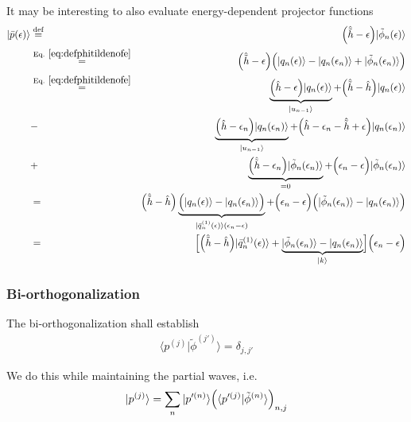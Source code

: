 \documentclass[11pt,a4paper]{report}
\begin{document}
It may be interesting to also evaluate energy-dependent projector
functions
\begin{eqnarray}
|\bar{p}(\epsilon)\rangle&\defas&
\Bigl(\hat{\tilde{h}}-\epsilon\Bigr)|\tilde{\phi}_n(\epsilon)\rangle
\nonumber\\
&\eqrel{eq:defphitildenofe}{=}&
\Bigl(\hat{\tilde{h}}-\epsilon\Bigr)
\Bigl(|q_n(\epsilon)\rangle-|q_n(\epsilon_n)\rangle+
|\tilde{\phi}_n(\epsilon_n)\rangle\Bigr)
\nonumber\\
&\eqrel{eq:defphitildenofe}{=}&
\underbrace{\Bigl(\hat{h}-\epsilon\Bigr)|q_n(\epsilon)\rangle}_{|u_{n-1}\rangle}
+\Bigl(\hat{\tilde{h}}-\hat{h}\Bigr)|q_n(\epsilon)\rangle
\nonumber\\
&-&\underbrace{
\Bigl(\hat{h}-\epsilon_n\Bigr)|q_n(\epsilon_n)\rangle}_{|u_{n-1}\rangle}
+\Bigl(\hat{h}-\epsilon_n-\hat{\tilde{h}}+\epsilon\Bigr)|q_n(\epsilon_n)\rangle
\nonumber\\
&+&\underbrace{\Bigl(\hat{\tilde{h}}-\epsilon_n\Bigr)|\tilde{\phi}_n(\epsilon_n)\rangle}_{=0}
+\Bigl(\epsilon_n-\epsilon\Bigr)|\tilde{\phi}_n(\epsilon_n)\rangle
\nonumber\\
&=&\Bigl(\hat{\tilde{h}}-\hat{h}\Bigr)
\underbrace{
\Bigl(|q_n(\epsilon)\rangle-|q_n(\epsilon_n)\rangle\Bigr)
}_{|\bar{q}_n^{(1)}(\epsilon)\rangle(\epsilon_n-\epsilon)}
+\Bigl(\epsilon_n-\epsilon\Bigr)
\Bigl(|\tilde{\phi}_n(\epsilon_n)\rangle
-|q_n(\epsilon_n)\rangle\Bigr)
\nonumber\\
&=&\Bigl[
\Bigl(\hat{\tilde{h}}-\hat{h}\Bigr)
|\bar{q}_n^{(1)}(\epsilon)\rangle
+
\underbrace{|\tilde{\phi}_n(\epsilon_n)\rangle
-|q_n(\epsilon_n)\rangle}_{|k\rangle}\Bigr]
\Bigl(\epsilon_n-\epsilon\Bigr)
\end{eqnarray}

\subsubsection{Bi-orthogonalization}
The bi-orthogonalization shall establish 
\begin{eqnarray}
\langle p^{(j)}|\tilde{\phi}^{(j')}\rangle=\delta_{j,j'}
\end{eqnarray}

We do this while maintaining the partial waves, i.e.
\begin{eqnarray}
|p^{(j)}\rangle=\sum_{n}|p'^{(n)}\rangle
\Bigl(\langle p'^{(j)}|\tilde{\phi}^{(n)}\rangle\Bigr)_{n,j}
\end{eqnarray}
\end{document}
